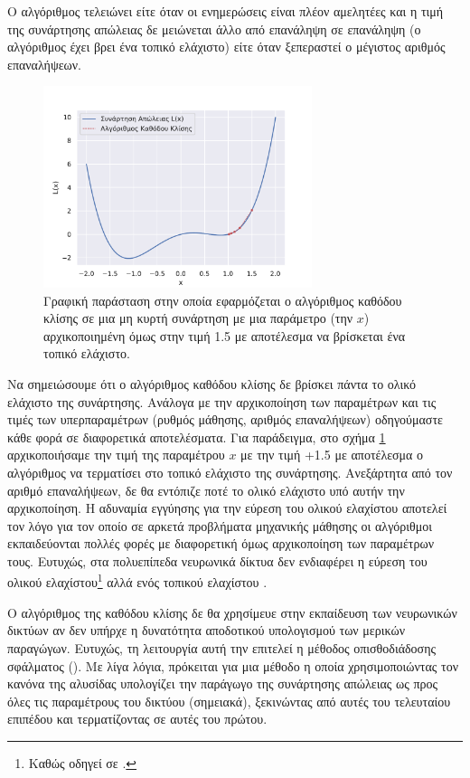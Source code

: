 Ο αλγόριθμος τελειώνει είτε όταν οι ενημερώσεις είναι πλέον αμελητέες και η τιμή της συνάρτησης απώλειας δε μειώνεται άλλο από επανάληψη σε επανάληψη (ο αλγόριθμος έχει βρει ένα τοπικό ελάχιστο) είτε όταν ξεπεραστεί ο μέγιστος αριθμός επαναλήψεων.\par

\begin{figure}[h]
  \centering
  \includegraphics[width=0.7\textwidth]{images/chapter theoritical background/gd_init_at_plus1point5.pdf}
  \caption{Γραφική παράσταση στην οποία εφαρμόζεται ο αλγόριθμος καθόδου κλίσης σε μια μη κυρτή συνάρτηση με μια παράμετρο (την $x$) αρχικοποιημένη όμως στην τιμή 1.5 με αποτέλεσμα να βρίσκεται ένα τοπικό ελάχιστο.}
  \label{fig:_gd15}
\end{figure}

Να σημειώσουμε ότι ο αλγόριθμος καθόδου κλίσης δε βρίσκει πάντα το ολικό ελάχιστο της συνάρτησης. Ανάλογα με την αρχικοποίηση των παραμέτρων και τις τιμές των υπερπαραμέτρων (ρυθμός μάθησης, αριθμός επαναλήψεων) οδηγούμαστε κάθε φορά σε διαφορετικά αποτελέσματα. Για παράδειγμα, στο σχήμα \ref{fig:_gd15} αρχικοποιήσαμε την τιμή της παραμέτρου $x$ με την τιμή +1.5 με αποτέλεσμα ο αλγόριθμος να τερματίσει στο τοπικό ελάχιστο της συνάρτησης. Ανεξάρτητα από τον αριθμό επαναλήψεων, δε θα εντόπιζε ποτέ το ολικό ελάχιστο υπό αυτήν την αρχικοποίηση. Η αδυναμία εγγύησης για την εύρεση του ολικού ελαχίστου αποτελεί τον λόγο για τον οποίο σε αρκετά προβλήματα μηχανικής μάθησης οι αλγόριθμοι εκπαιδεύονται πολλές φορές με διαφορετική όμως αρχικοποίηση των παραμέτρων τους. Ευτυχώς, στα πολυεπίπεδα νευρωνικά δίκτυα δεν ενδιαφέρει η εύρεση του ολικού ελαχίστου\footnote{Καθώς οδηγεί σε .} αλλά ενός τοπικού ελαχίστου \cite{choromanska2015loss}.\par

Ο αλγόριθμος της καθόδου κλίσης δε θα χρησίμευε στην εκπαίδευση των νευρωνικών δικτύων αν δεν υπήρχε η δυνατότητα αποδοτικού υπολογισμού των μερικών παραγώγων. Ευτυχώς, τη λειτουργία αυτή την επιτελεί η μέθοδος οπισθοδιάδοσης σφάλματος (). Με λίγα λόγια, πρόκειται για μια μέθοδο η οποία χρησιμοποιώντας τον κανόνα της αλυσίδας υπολογίζει την παράγωγο της συνάρτησης απώλειας ως προς όλες τις παραμέτρους του δικτύου (σημειακά), ξεκινώντας από αυτές του τελευταίου επιπέδου και τερματίζοντας σε αυτές του πρώτου.\par

